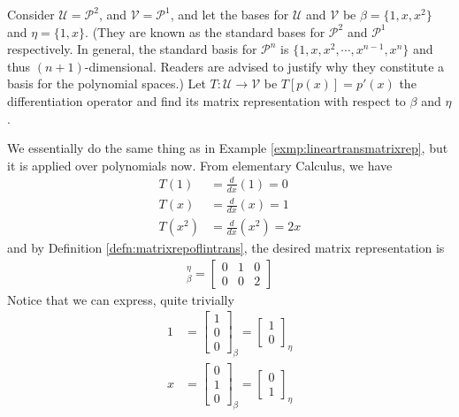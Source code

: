 \begin{exmp}
\label{exmp:lineartransderivative}
Consider $\mathcal{U} = \mathcal{P}^2$, and $\mathcal{V} = \mathcal{P}^1$, and let the bases for $\mathcal{U}$ and $\mathcal{V}$ be $\mathcal{\beta} = \{1, x, x^2\}$ and $\mathcal{\eta} = \{1, x\}$. (They are known as the standard bases for $\mathcal{P}^2$ and $\mathcal{P}^1$ respectively. In general, the standard basis for $\mathcal{P}^n$ is $\{1, x, x^2, \cdots, x^{n-1}, x^n\}$ and thus $(n+1)$-dimensional. Readers are advised to justify why they constitute a basis for the polynomial spaces.) Let $T: \mathcal{U} \to \mathcal{V}$ be $T[p(x)] = p'(x)$ the differentiation operator and find its matrix representation with respect to $\mathcal{\beta}$ and $\mathcal{\eta}$.
\end{exmp}
\begin{solution}
We essentially do the same thing as in Example \ref{exmp:lineartransmatrixrep}, but it is applied over polynomials now. From elementary Calculus, we have
\begin{align*}
T(1) &= \frac{d}{dx}(1) = 0 \\
T(x) &= \frac{d}{dx}(x) = 1 \\
T(x^2) &= \frac{d}{dx}(x^2) = 2x
\end{align*}
and by Definition \ref{defn:matrixrepoflintrans}, the desired matrix representation is
\begin{align*}
[T]_\beta^\eta = 
\begin{bmatrix}
0 & 1 & 0 \\
0 & 0 & 2
\end{bmatrix}
\end{align*}
Notice that we can express, quite trivially
\begin{align*}
1 &= \begin{bmatrix}
1 \\
0 \\
0
\end{bmatrix}_\beta
=
\begin{bmatrix}
1 \\
0
\end{bmatrix}_\eta \\
x &= \begin{bmatrix}
0 \\
1 \\
0
\end{bmatrix}_\beta
=
\begin{bmatrix}
0 \\
1
\end{bmatrix}_\eta \\

\end{align*}
\end{solution}

